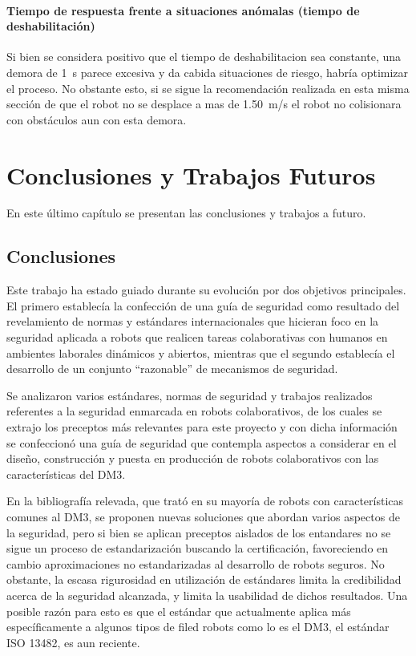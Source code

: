 \documentclass[withindex,glossary]{cam-thesis}
\begin{document}
\subsubsection{Tiempo de respuesta frente a situaciones anómalas (tiempo de deshabilitación)}
Si bien se considera positivo que el tiempo de deshabilitacion sea constante, una demora de \SI{1}{\second} parece excesiva y da cabida situaciones de riesgo, habría optimizar el proceso. No obstante esto, si se sigue la recomendación realizada en esta misma sección de que el robot no se desplace a mas de \SI{1.50}{\metre/\second} el robot no colisionara con obstáculos aun con esta demora.

\chapter{Conclusiones y Trabajos Futuros}

En este último capítulo se presentan las conclusiones y trabajos a futuro.

\section{Conclusiones}
Este trabajo ha estado guiado durante su evolución por dos objetivos principales. El primero establecía la confección de una guía de seguridad como resultado del revelamiento de normas y estándares internacionales que hicieran foco en la seguridad aplicada a robots que realicen tareas colaborativas con humanos en ambientes laborales dinámicos y abiertos, mientras que el segundo establecía el desarrollo de un conjunto ``razonable'' de mecanismos de seguridad.

Se analizaron varios estándares, normas de seguridad y trabajos realizados referentes a la seguridad enmarcada en robots colaborativos, de los cuales se extrajo los preceptos más relevantes para este proyecto y con dicha información se confeccionó una guía de seguridad que contempla aspectos a considerar en el diseño, construcción y puesta en producción de robots colaborativos con las características del DM3.

En la bibliografía relevada, que trató en su mayoría de robots con características comunes al DM3, se proponen nuevas soluciones que abordan varios aspectos de la seguridad, pero si bien se aplican preceptos aislados de los entandares no se sigue un proceso de estandarización buscando la certificación, favoreciendo en cambio aproximaciones no estandarizadas al desarrollo de robots seguros. No obstante, la escasa rigurosidad en utilización de estándares limita la credibilidad acerca de la seguridad alcanzada, y limita la usabilidad de dichos resultados. Una posible razón para esto es que el estándar que actualmente aplica más específicamente a algunos tipos de filed robots como lo es el DM3, el estándar ISO 13482, es aun reciente.
\end{document}
